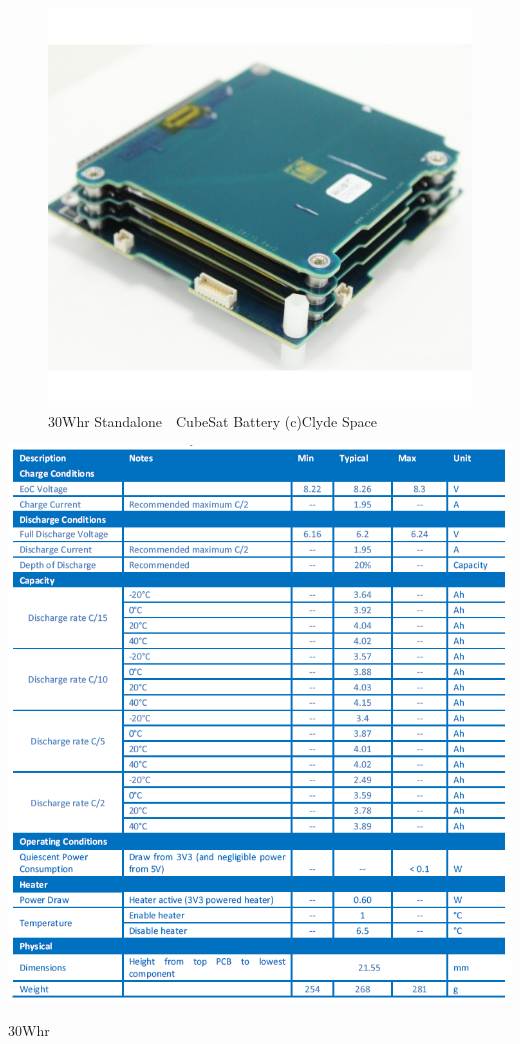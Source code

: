 \begin{figure}[htbp]
	\begin{center}
		\includegraphics[width=0.5\linewidth]{./03/fig/battery.jpg}
		\caption{30Whr Standalone　CubeSat Battery (c)Clyde Space}
		\label{fig3_1_bat}
	\end{center}
\end{figure}

\begin{table}[htbp]
	\begin{center}
		\includegraphics[width=0.9\linewidth]{./03/fig/battery_spec.png}
		\caption{30Whr}
		\label{table3_1_bat_spec}
	\end{center}
\end{table}


